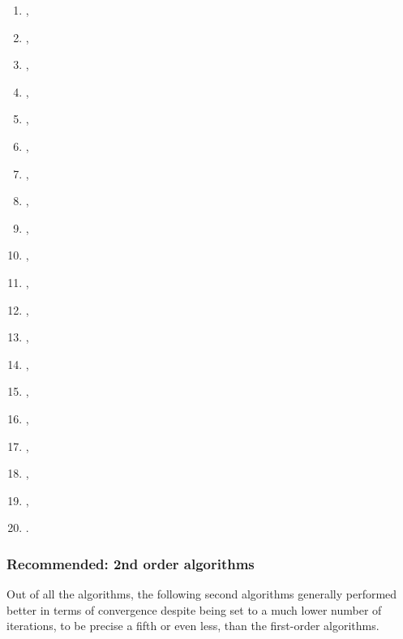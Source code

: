 \begin{enumerate}
\item
   \citep{R-rasclass},
\item
   \citep{R-rcane},
\item
   \citep{R-regressoR},
\item
   \citep{R-rminer},
\item
   \citep{R-rnn},
\item
   \citep{R-RSNNS},
\item
   \citep{R-ruta},
\item
   \citep{R-simpleNeural},
\item
   \citep{R-snnR},
\item
   \citep{R-softmaxreg},
\item
   \citep{R-Sojourn.Data},
\item
   \citep{R-spnn},
\item
   \citep{R-TeachNet},
\item
   \citep{R-tensorflow},
\item
   \citep{R-tfestimators},
\item
   \citep{R-trackdem},
\item
   \citep{R-TrafficBDE},
\item
   \citep{R-tsensembler},
\item
   \citep{R-validann},
\item
   \citep{R-zFactor}.
\end{enumerate}

\hypertarget{recommended-2nd-order-algorithms}{%
\subsubsection{Recommended: 2nd order
algorithms}\label{recommended-2nd-order-algorithms}}

Out of all the algorithms, the following second algorithms generally
performed better in terms of convergence despite being set to a much
lower number of iterations, to be precise a fifth or even less, than the
first-order algorithms.

